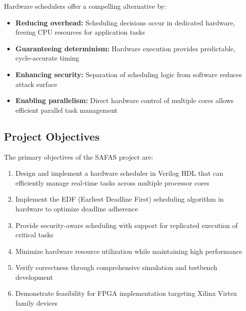 \documentclass[12pt,a4paper]{article}
\begin{document}
Hardware schedulers offer a compelling alternative by:
\begin{itemize}
    \item \textbf{Reducing overhead:} Scheduling decisions occur in dedicated hardware, freeing CPU resources for application tasks
    \item \textbf{Guaranteeing determinism:} Hardware execution provides predictable, cycle-accurate timing
    \item \textbf{Enhancing security:} Separation of scheduling logic from software reduces attack surface
    \item \textbf{Enabling parallelism:} Direct hardware control of multiple cores allows efficient parallel task management
\end{itemize}

\subsection{Project Objectives}
The primary objectives of the SAFAS project are:
\begin{enumerate}
    \item Design and implement a hardware scheduler in Verilog HDL that can efficiently manage real-time tasks across multiple processor cores
    \item Implement the EDF (Earliest Deadline First) scheduling algorithm in hardware to optimize deadline adherence
    \item Provide security-aware scheduling with support for replicated execution of critical tasks
    \item Minimize hardware resource utilization while maintaining high performance
    \item Verify correctness through comprehensive simulation and testbench development
    \item Demonstrate feasibility for FPGA implementation targeting Xilinx Virtex family devices
\end{enumerate}
\end{document}

